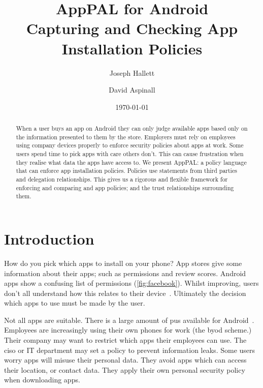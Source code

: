 \documentclass[a4paper]{scrartcl}
\title{AppPAL for Android\\
Capturing and Checking App Installation Policies}
\author{Joseph Hallett \and David Aspinall}
\date{\today}
\newcommand{\comment}[1]{}%
\begin{document}
\maketitle

\begin{abstract}
  When a user buys an app on Android they can only judge available apps based only on the information presented to them by the store.
  Employers must rely on employees using company devices properly to enforce security policies about apps at work.
  Some users spend time to pick apps with care others don't.
  This can cause frustration when they realise what data the apps have access to.
  We present AppPAL: a policy language that can enforce app installation policies.
  Policies use statements from third parties and delegation relationships.
  This gives us a rigorous and flexible framework for enforcing and comparing and app policies; and the trust relationships surrounding them.
\end{abstract}

\section{Introduction \comment{1 page}}
\label{sec:introduction}

How do you pick which apps to install on your phone?  
App stores give some information about their apps; such as permissions and review scores.
Android apps show a confusing list of permissions (\autoref{fig:facebook}).
Whilst improving, users don't all understand how this relates to their device~\citep{Felt:2012hm,Thompson:2013eb}.
Ultimately the decision which apps to use must be made by the user.

Not all apps are suitable. 
There is a large amount of \ac{pus} available for Android~\citep{Truong:2014bi,Svajcer:2013tp}. 
Employees are increasingly using their own phones for work (the \ac{byod} scheme.)
Their company may want to restrict which apps their employees can use.
The \ac{ciso} or IT department may set a policy to prevent information leaks.
Some users worry apps will misuse their personal data.
They avoid apps which can access their location, or contact data.
They apply their own personal security policy when downloading apps.
\end{document}
